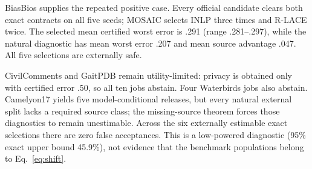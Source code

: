BiasBios supplies the repeated positive case. Every official candidate clears
both exact contracts on all five seeds; MOSAIC selects INLP three times and
R-LACE twice. The selected mean certified worst error is .291 (range
.281--.297), while the natural diagnostic has mean worst error .207 and mean
source advantage .047. All five selections are externally safe.

CivilComments and GaitPDB remain utility-limited: privacy is obtained only with
certified error .50, so all ten jobs abstain. Four Waterbirds jobs also abstain.
Camelyon17 yields five model-conditional releases, but every natural external
split lacks a required source class; the missing-source theorem forces those
diagnostics to remain unestimable. Across the six externally estimable exact
selections there are zero false acceptances. This is a low-powered diagnostic
(95\% exact upper bound 45.9\%), not evidence that the benchmark populations
belong to Eq.~\eqref{eq:shift}.
